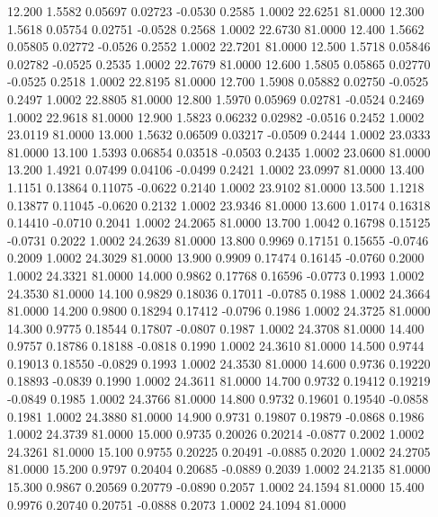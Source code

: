   12.200   1.5582   0.05697   0.02723  -0.0530   0.2585   1.0002  22.6251  81.0000
  12.300   1.5618   0.05754   0.02751  -0.0528   0.2568   1.0002  22.6730  81.0000
  12.400   1.5662   0.05805   0.02772  -0.0526   0.2552   1.0002  22.7201  81.0000
  12.500   1.5718   0.05846   0.02782  -0.0525   0.2535   1.0002  22.7679  81.0000
  12.600   1.5805   0.05865   0.02770  -0.0525   0.2518   1.0002  22.8195  81.0000
  12.700   1.5908   0.05882   0.02750  -0.0525   0.2497   1.0002  22.8805  81.0000
  12.800   1.5970   0.05969   0.02781  -0.0524   0.2469   1.0002  22.9618  81.0000
  12.900   1.5823   0.06232   0.02982  -0.0516   0.2452   1.0002  23.0119  81.0000
  13.000   1.5632   0.06509   0.03217  -0.0509   0.2444   1.0002  23.0333  81.0000
  13.100   1.5393   0.06854   0.03518  -0.0503   0.2435   1.0002  23.0600  81.0000
  13.200   1.4921   0.07499   0.04106  -0.0499   0.2421   1.0002  23.0997  81.0000
  13.400   1.1151   0.13864   0.11075  -0.0622   0.2140   1.0002  23.9102  81.0000
  13.500   1.1218   0.13877   0.11045  -0.0620   0.2132   1.0002  23.9346  81.0000
  13.600   1.0174   0.16318   0.14410  -0.0710   0.2041   1.0002  24.2065  81.0000
  13.700   1.0042   0.16798   0.15125  -0.0731   0.2022   1.0002  24.2639  81.0000
  13.800   0.9969   0.17151   0.15655  -0.0746   0.2009   1.0002  24.3029  81.0000
  13.900   0.9909   0.17474   0.16145  -0.0760   0.2000   1.0002  24.3321  81.0000
  14.000   0.9862   0.17768   0.16596  -0.0773   0.1993   1.0002  24.3530  81.0000
  14.100   0.9829   0.18036   0.17011  -0.0785   0.1988   1.0002  24.3664  81.0000
  14.200   0.9800   0.18294   0.17412  -0.0796   0.1986   1.0002  24.3725  81.0000
  14.300   0.9775   0.18544   0.17807  -0.0807   0.1987   1.0002  24.3708  81.0000
  14.400   0.9757   0.18786   0.18188  -0.0818   0.1990   1.0002  24.3610  81.0000
  14.500   0.9744   0.19013   0.18550  -0.0829   0.1993   1.0002  24.3530  81.0000
  14.600   0.9736   0.19220   0.18893  -0.0839   0.1990   1.0002  24.3611  81.0000
  14.700   0.9732   0.19412   0.19219  -0.0849   0.1985   1.0002  24.3766  81.0000
  14.800   0.9732   0.19601   0.19540  -0.0858   0.1981   1.0002  24.3880  81.0000
  14.900   0.9731   0.19807   0.19879  -0.0868   0.1986   1.0002  24.3739  81.0000
  15.000   0.9735   0.20026   0.20214  -0.0877   0.2002   1.0002  24.3261  81.0000
  15.100   0.9755   0.20225   0.20491  -0.0885   0.2020   1.0002  24.2705  81.0000
  15.200   0.9797   0.20404   0.20685  -0.0889   0.2039   1.0002  24.2135  81.0000
  15.300   0.9867   0.20569   0.20779  -0.0890   0.2057   1.0002  24.1594  81.0000
  15.400   0.9976   0.20740   0.20751  -0.0888   0.2073   1.0002  24.1094  81.0000
